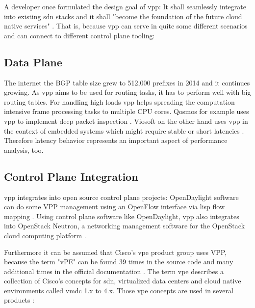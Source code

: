 
A developer once formulated the design goal of \Ac{vpp}: It shall
seamlessly integrate into existing \Ac{sdn} stacks and it shall
"become the foundation of the future cloud native services"
\cite{florincoras}. That is, because \Ac{vpp} can serve in quite some
different scenarios and can connect to different control plane
tooling:

\subsection{Data Plane}


The internet the BGP table size grew to 512,000 prefixes in 2014 and
it continues growing. As \Ac{vpp} aims to be used for routing tasks,
it has to perform well with big routing tables. \cite{bgphelp:size}
For handling high loads \Ac{vpp} helps spreading the computation
intensive frame processing tasks to multiple CPU cores. Qosmos for
example uses \Ac{vpp} to implement deep packet inspection
\cite{qosmos}. Viosoft on the other hand uses \Ac{vpp} in the context
of embedded systems which might require stable or short latencies
\cite{viosoft}. Therefore latency behavior represents an important
aspect of performance analysis, too.


\subsection{Control Plane Integration}

\Ac{vpp} integrates into open source control plane projects:
OpenDaylight software can do some VPP management using an OpenFlow
interface via \Ac{lisp} flow mapping \cite{opendaylight:lisp}. Using
control plane software like OpenDaylight, \Ac{vpp} also integrates
into OpenStack Neutron, a networking management software for the
OpenStack cloud computing platform \cite{fdio:integration}.



Furthermore it can be assumed that Cisco's \Ac{vpe} product group uses
VPP, because the term "vPE" can be found 39 times in the source code
and many additional times in the official documentation
\cite{vppdocs}. \newpage
The term \Ac{vpe} describes a collection of Cisco's concepts for
\Ac{sdn}, virtualized data centers and cloud native environments
called \Ac{vmdc} 1.x to 4.x. Those \Ac{vpe} concepts are used in
several products \cite{cisco:sdn}:

